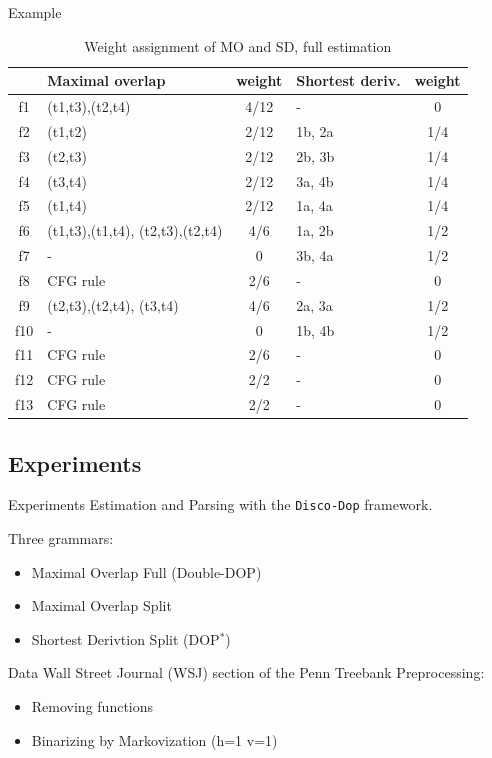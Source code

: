 \documentclass{beamer}
\newcommand{\dops}[0]{DOP$ ^*$}
\newcommand{\ddop}[0]{Double-DOP}
\begin{document}
\begin{frame}{Example}
\begin{table}
\footnotesize
\begin{tabular}{c|p{}c|p{}c|}
&Maximal overlap&weight&Shortest deriv.\footnotemark&weight\\\hline
f1&(t1,t3),(t2,t4)&4/12&-&0\\
f2&(t1,t2)&2/12&1b, 2a&1/4\\
f3&(t2,t3)&2/12&2b, 3b&1/4\\
f4&(t3,t4)&2/12&3a, 4b&1/4\\
f5&(t1,t4)&2/12&1a, 4a&1/4\\
f6&(t1,t3),(t1,t4), (t2,t3),(t2,t4)&4/6&1a, 2b&1/2\\
f7&-&0&3b, 4a&1/2\\
f8&CFG rule&2/6&-&0\\
f9&(t2,t3),(t2,t4), (t3,t4)&4/6&2a, 3a&1/2\\
f10&-&0&1b, 4b&1/2\\
f11&CFG rule&2/6&-&0\\
f12&CFG rule&2/2&-&0\\
f13&CFG rule&2/2&-&0\\
\end{tabular}

\caption{Weight assignment of MO and SD, full estimation}
\end{table}

\end{frame}


\subsection{Experiments}
\begin{frame}{Experiments}
Estimation and Parsing with the {\tt Disco-Dop} framework.

Three grammars:
\begin{itemize}
\item Maximal Overlap Full (\ddop{})
\item Maximal Overlap Split
\item Shortest Derivtion Split (\dops{})
\end{itemize}
\end{frame}
\begin{frame}{Data}
Wall Street Journal (WSJ) section of the Penn Treebank
Preprocessing:\begin{itemize}
\item Removing functions
\item Binarizing by Markovization (h=1 v=1)
\end{itemize}
\end{frame}
\end{document}
